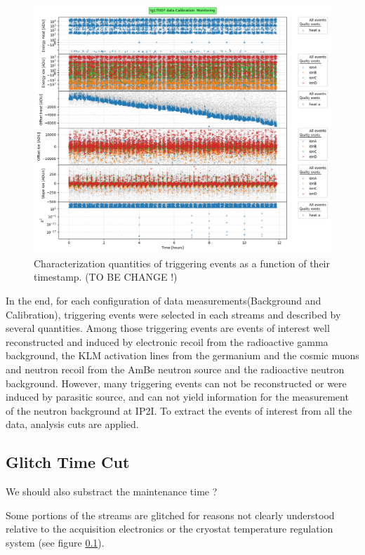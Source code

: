 \begin{figure}
\centering
\includegraphics[width=\linewidth,]{Figures/Neutron/analysis_monitoring_demo.png}
\caption{Characterization quantities of triggering events as a function of their timestamp. (TO BE CHANGE !)}
\label{fig:analysis-monitoring-demo}
\end{figure}

In the end, for each configuration of data measurements(Background and Calibration), triggering events were selected in each streams and described by several quantities.
Among those triggering events are events of interest well reconstructed and induced by electronic recoil from the radioactive gamma background, the KLM activation lines from the germanium and the cosmic muons and neutron recoil from the AmBe neutron source and the radioactive neutron background. However, many triggering events can not be reconstructed or were induced by parasitic source, and can not yield information for the measurement of the neutron background at IP2I. To extract the events of interest from all the data, analysis cuts are applied.


\subsection{Glitch Time Cut}

{\color{red} We should also substract the maintenance time ?}

Some portions of the streams are glitched for reasons not clearly understood relative to the acquisition electronics or the cryostat temperature regulation system (see figure \ref{}).

